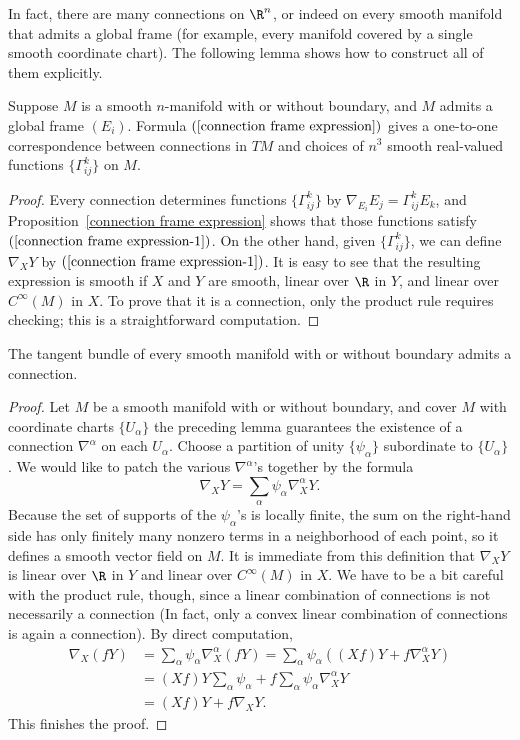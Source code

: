 In fact, there are many connections on $\R^n$, or indeed on every smooth manifold that admits 
a global frame (for example, every manifold covered by a single smooth coordinate chart). The 
following lemma shows how to construct all of them explicitly.
\begin{lemma}
Suppose $M$ is a smooth $n$-manifold with or without boundary, and $M$ admits a global frame 
$(E_i)$. Formula $(\ref{connection frame expression})$ gives a one-to-one correspondence between 
connections in $TM$ and choices of $n^3$ smooth real-valued functions $\{\Gamma_{ij}^k\}$ on $M$.
\end{lemma}
\begin{proof}
Every connection determines functions $\{\Gamma_{ij}^k\}$ by $\nabla_{E_i}E_j=\Gamma_{ij}^kE_k$, 
and Proposition~\ref{connection frame expression} shows that those functions satisfy $(\ref{connection frame expression-1})$. 
On the other hand, given $\{\Gamma_{ij}^k\}$, we can define $\nabla_XY$ by $(\ref{connection frame expression-1})$. 
It is easy to see that the resulting expression is smooth if $X$ and $Y$ are smooth, linear 
over $\R$ in $Y$, and linear over $C^{\infty}(M)$ in $X$. To prove that it is a connection, 
only the product rule requires checking; this is a straightforward computation.
\end{proof}
\begin{proposition}
The tangent bundle of every smooth manifold with or without boundary admits a connection.
\end{proposition}
\begin{proof}
Let $M$ be a smooth manifold with or without boundary, and cover $M$ with coordinate charts 
$\{U_\alpha\}$ the preceding lemma guarantees the existence of a connection $\nabla^{\alpha}$ 
on each $U_\alpha$. Choose a partition of unity $\{\psi_\alpha\}$ subordinate to $\{U_\alpha\}$. 
We would like to patch the various $\nabla^{\alpha}$'s together by the formula
\[\nabla_XY=\sum_{\alpha}\psi_\alpha\nabla^\alpha_XY.\]
Because the set of supports of the $\psi_\alpha$'s is locally finite, the sum on the 
right-hand side has only finitely many nonzero terms in a neighborhood of each point, so it 
defines a smooth vector field on $M$. It is immediate from this definition that $\nabla_XY$ 
is linear over $\R$ in $Y$ and linear over $C^{\infty}(M)$ in $X$. We have to be a bit 
careful with the product rule, though, since a linear combination of connections is not 
necessarily a connection (In fact, only a convex linear combination of connections is again a 
connection). By direct computation,
\begin{align*}
\nabla_X(fY)&=\sum_{\alpha}\psi_\alpha\nabla^\alpha_X(fY)=\sum_{\alpha}\psi_\alpha((Xf)Y+f\nabla^\alpha_XY)\\
&=(Xf)Y\sum_{\alpha}\psi_\alpha+f\sum_{\alpha}\psi_\alpha\nabla^\alpha_XY\\
&=(Xf)Y+f\nabla_XY.
\end{align*}
This finishes the proof.
\end{proof}
